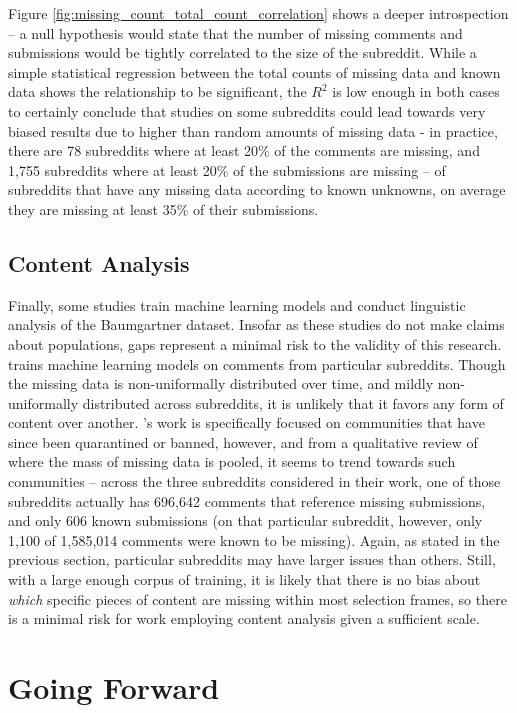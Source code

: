 \documentclass[letterpaper,12pt]{article}
\begin{document}
Figure \ref{fig:missing_count_total_count_correlation} shows a deeper introspection -- a null hypothesis would state that the number of missing comments and submissions would be tightly correlated to the size of the subreddit. While a simple statistical regression between the total counts of missing data and known data shows the relationship to be significant, the $R^2$ is low enough in both cases to certainly conclude that studies on some subreddits could lead towards very biased results due to higher than random amounts of missing data - in practice, there are 78 subreddits where at least 20$\%$ of the comments are missing, and 1,755 subreddits where at least 20$\%$ of the submissions are missing -- of subreddits that have any missing data according to known unknowns, on average they are missing at least 35$\%$ of their submissions.

\subsection{Content Analysis}

Finally, some studies train machine learning models and conduct linguistic analysis of the Baumgartner dataset. Insofar as these studies do not make claims about populations, gaps represent a minimal risk to the validity of this research.  trains machine learning models on comments from particular subreddits. Though the missing data is non-uniformally distributed over time, and mildly non-uniformally distributed across subreddits, it is unlikely that it favors any form of content over another. 's work is specifically focused on communities that have since been quarantined or banned, however, and from a qualitative review of where the mass of missing data is pooled, it seems to trend towards such communities -- across the three subreddits considered in their work, one of those subreddits actually has 696,642 comments that reference missing submissions, and only 606 known submissions (on that particular subreddit, however, only 1,100 of 1,585,014 comments were known to be missing). Again, as stated in the previous section, particular subreddits may have larger issues than others. Still, with a large enough corpus of training, it is likely that there is no bias about \textit{which} specific pieces of content are missing within most selection frames, so there is a minimal risk for work employing content analysis given a sufficient scale.

\section{Going Forward}
\end{document}
